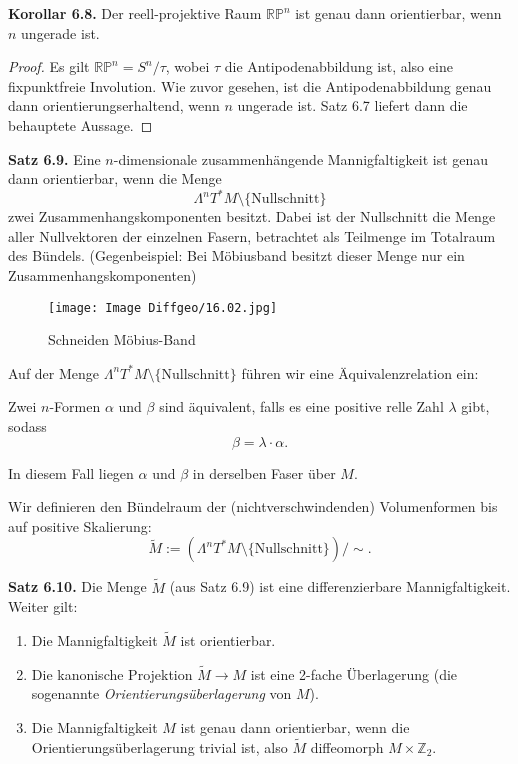 \documentclass[fleqn, 12pt, letterpaper]{article}
\begin{document}
\textbf{Korollar 6.8.}  
Der reell-projektive Raum \( \mathbb{RP}^n \) ist genau dann orientierbar, wenn \( n \) ungerade ist.

\begin{proof}
Es gilt \( \mathbb{RP}^n = S^n / \tau \), wobei \( \tau \) die Antipodenabbildung ist, also eine fixpunktfreie Involution. Wie zuvor gesehen, ist die Antipodenabbildung genau dann orientierungserhaltend, wenn \( n \) ungerade ist. Satz 6.7 liefert dann die behauptete Aussage.
\end{proof}

\textbf{Satz 6.9.}  
Eine \( n \)-dimensionale zusammenhängende Mannigfaltigkeit ist genau dann orientierbar,  
wenn die Menge
\[
\Lambda^n T^*M \setminus \{ \text{Nullschnitt} \}
\]
zwei Zusammenhangskomponenten besitzt. Dabei ist der Nullschnitt die Menge aller Nullvektoren der einzelnen Fasern,  
betrachtet als Teilmenge im Totalraum des Bündels. (Gegenbeispiel: Bei Möbiusband besitzt dieser Menge nur ein Zusammenhangskomponenten)

  \begin{figure}[H]
    \centering
    \texttt{[image: Image Diffgeo/16.02.jpg]}
    \caption{Schneiden Möbius-Band}
 \end{figure}

\vspace{1em}

Auf der Menge \( \Lambda^n T^*M \setminus \{ \text{Nullschnitt} \} \)  
führen wir eine Äquivalenzrelation ein:

Zwei \( n \)-Formen \( \alpha \) und \( \beta \) sind äquivalent,  
falls es eine positive relle Zahl \( \lambda \)  gibt, sodass  
\[
\beta = \lambda \cdot \alpha.
\]

In diesem Fall liegen \( \alpha \) und \( \beta \) in derselben Faser über \( M \).

Wir definieren den Bündelraum der (nichtverschwindenden) Volumenformen bis auf positive Skalierung:
\[
\widetilde{M} := (\Lambda^n T^*M \setminus \{ \text{Nullschnitt} \}) / \sim.
\]

\textbf{Satz 6.10.}  
Die Menge \( \widetilde{M} \) (aus Satz 6.9) ist eine differenzierbare Mannigfaltigkeit. Weiter gilt:

\begin{enumerate}[label=\roman*)]
    \item Die Mannigfaltigkeit \( \widetilde{M} \) ist orientierbar.
    
    \item Die kanonische Projektion \( \widetilde{M} \to M \) ist eine 2-fache Überlagerung  
    (die sogenannte \emph{Orientierungsüberlagerung} von \( M \)).

    \item Die Mannigfaltigkeit \( M \) ist genau dann orientierbar, wenn die Orientierungsüberlagerung trivial ist,  
    also \( \widetilde{M}\) diffeomorph \( M \times \mathbb{Z}_2 \).
\end{enumerate}
\end{document}
